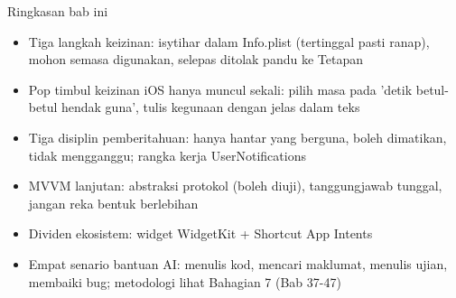 \begin{tcbsummary}{Ringkasan bab ini}
\begin{itemize}
  \item Tiga langkah keizinan: isytihar dalam Info.plist (tertinggal pasti ranap), mohon semasa digunakan, selepas ditolak pandu ke Tetapan
  \item Pop timbul keizinan iOS hanya muncul sekali: pilih masa pada 'detik betul-betul hendak guna', tulis kegunaan dengan jelas dalam teks
  \item Tiga disiplin pemberitahuan: hanya hantar yang berguna, boleh dimatikan, tidak mengganggu; rangka kerja UserNotifications
  \item MVVM lanjutan: abstraksi protokol (boleh diuji), tanggungjawab tunggal, jangan reka bentuk berlebihan
  \item Dividen ekosistem: widget WidgetKit + Shortcut App Intents
  \item Empat senario bantuan AI: menulis kod, mencari maklumat, menulis ujian, membaiki bug; metodologi lihat Bahagian 7 (Bab 37-47)
\end{itemize}

\end{tcbsummary}
